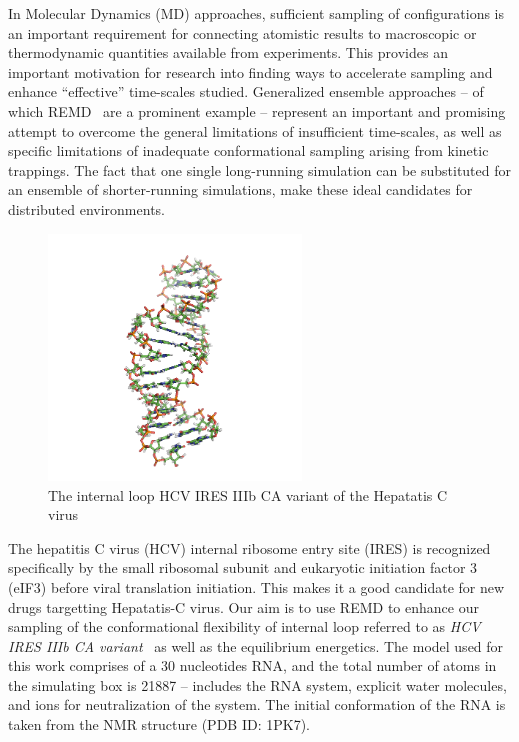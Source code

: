 \documentclass{rspublic}
\newcommand{\jhanote}[1]{ {\textcolor{red} { ***SJ: #1 }}}
\newcommand{\jhanote}[1]{}
\begin{document}

In Molecular Dynamics (MD) approaches, sufficient sampling of
configurations is an important requirement for connecting atomistic
results to macroscopic or thermodynamic quantities available from
experiments.  This provides an important motivation for research into
finding ways to accelerate sampling and enhance ``effective''
time-scales studied. Generalized ensemble approaches -- of which
REMD~\citep{Sugita:1999rm} are a prominent example -- represent an
important and promising attempt to overcome the general limitations of
insufficient time-scales, as well as specific limitations of
inadequate conformational sampling arising from kinetic trappings.
The fact that one single long-running simulation can be substituted
for an ensemble of shorter-running simulations, make these ideal
candidates for distributed environments.

\begin{figure}[t]
      \centering
      \includegraphics[width=0.6\textwidth]{1KP7}   
      \caption{The internal loop HCV IRES IIIb CA variant of the
        Hepatatis C virus}
      \label{}
\end{figure}

The hepatitis C virus (HCV) internal ribosome entry site (IRES) is
recognized specifically by the small ribosomal subunit and eukaryotic
initiation factor 3 (eIF3) before viral translation initiation.  This
makes it a good candidate for new drugs targetting Hepatatis-C virus.
Our aim is to use REMD to enhance our sampling of the conformational
flexibility of internal loop referred to as {\it HCV IRES IIIb CA
  variant}~\citep{Collier:2002wd} as well as the equilibrium
energetics.  The model used for this work comprises of a 30
nucleotides RNA, and the total number of atoms in the simulating box
is 21887 -- includes the RNA system, explicit water molecules, and
ions for neutralization of the system.  The initial conformation of
the RNA is taken from the NMR structure (PDB ID: 1PK7).  
\end{document}
